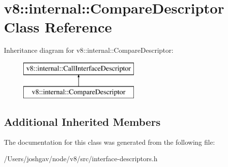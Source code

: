 \hypertarget{classv8_1_1internal_1_1_compare_descriptor}{}\section{v8\+:\+:internal\+:\+:Compare\+Descriptor Class Reference}
\label{classv8_1_1internal_1_1_compare_descriptor}
Inheritance diagram for v8\+:\+:internal\+:\+:Compare\+Descriptor\+:\begin{figure}[H]
\begin{center}
\leavevmode
\includegraphics[height=2.000000cm]{classv8_1_1internal_1_1_compare_descriptor}
\end{center}
\end{figure}
\subsection*{Additional Inherited Members}


The documentation for this class was generated from the following file\+:\begin{DoxyCompactItemize}
\item 
/\+Users/joshgav/node/v8/src/interface-\/descriptors.\+h\end{DoxyCompactItemize}
